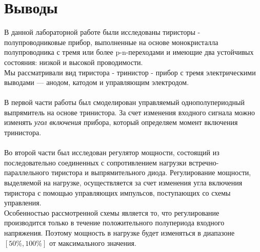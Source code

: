 \documentclass[12pt]{article}
\begin{document}
\section*{Выводы}
В данной лабораторной работе были исследованы тиристоры - полупроводниковые прибор, выполненные на основе монокристалла полупроводника с тремя или более p-n-переходами и имеющие два устойчивых состояния: низкой и высокой проводимости. \\
Мы рассматривали вид тиристора - тринистор - прибор с тремя электрическими выводами — анодом, катодом и управляющим электродом. \\
\ \\
В первой части работы был смоделирован управляемый однополупериодный выпрямитель на основе тринистора. За счет изменения входного сигнала можно изменять \emph{угол включения} прибора, который определяем момент включения тринистора. \\
\ \\
Во второй части был исследован регулятор мощности, состоящий из последовательно соединенных с сопротивлением нагрузки встречно-параллельного тиристора и выпрямительного диода. Регулирование мощности, выделяемой на нагрузке, осуществляется за счет изменения угла включения тиристора с помощью управляющих импульсов, поступающих со схемы управления. \\
Особенностью рассмотренной схемы является то, что регулирование производится только в течение положительного полупериода входного напряжения. Поэтому мощность в нагрузке будет изменяться в диапазоне $[50\%, 100\%]$ от
максимального значения.
\end{document}
